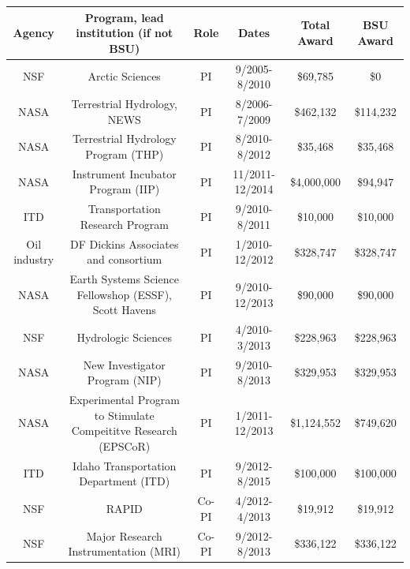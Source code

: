 \documentclass[11pt]{article}
\begin{document}
\begin{table}[!htbp]
\tiny
\begin{tabular}{cccccc}
Agency           & Program, lead institution (if not BSU)                                     & Role  & Dates            & Total Award & BSU Award \\ \hline
NSF              & Arctic Sciences                                                         & PI    & 9/2005-8/2010    & \$69,785     & \$0  \\
NASA             & Terrestrial Hydrology, NEWS                                             & PI    & 8/2006-7/2009    & \$462,132    & \$114,232  \\
NASA             & Terrestrial Hydrology Program (THP)                                     & PI    & 8/2010-8/2012    & \$35,468     & \$35,468  \\
NASA             & Instrument Incubator Program (IIP)                                      & PI    & 11/2011-12/2014  & \$4,000,000  & \$94,947  \\
ITD              & Transportation Research Program                                         & PI    & 9/2010-8/2011    & \$10,000     & \$10,000 \\
Oil industry     & DF Dickins Associates and consortium                                    & PI    & 1/2010-12/2012   & \$328,747    & \$328,747  \\
NASA             & Earth Systems Science Fellowshop (ESSF), Scott Havens                    & PI    & 9/2010-12/2013   & \$90,000     & \$90,000  \\
NSF              & Hydrologic Sciences                                                     & PI    & 4/2010-3/2013    & \$228,963    & \$228,963 \\
NASA             & New Investigator Program (NIP)                                          & PI    & 9/2010-8/2013    & \$329,953    & \$329,953  \\
NASA             & Experimental Program to Stimulate Compeititve Research (EPSCoR)         & PI    & 1/2011-12/2013   & \$1,124,552  & \$749,620 \\
ITD              & Idaho Transportation Department (ITD)                                   & PI    & 9/2012-8/2015    & \$100,000    & \$100,000  \\
NSF              & RAPID                                                                   & Co-PI & 4/2012-4/2013    & \$19,912     & \$19,912  \\
NSF              & Major Research Instrumentation (MRI)                                    & Co-PI & 9/2012-8/2013    & \$336,122    & \$336,122 \\

\end{tabular}
\end{table}
\end{document}
